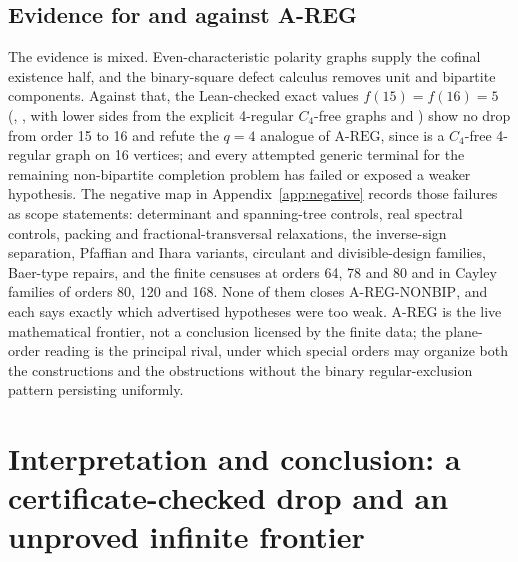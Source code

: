 \documentclass{anvil-paper}
\newcommand{\AREG}{\mathrm{A\text{-}REG}}
\newcommand{\NONBIP}{\mathrm{A\text{-}REG\text{-}NONBIP}}
\theoremstyle{definition}
\begin{document}
\subsection{Evidence for and against A-REG}\label{sec:areg-evidence}

The evidence is mixed. Even-characteristic polarity graphs supply the cofinal existence half, and the binary-square defect calculus removes unit and bipartite components. Against that, the Lean-checked exact values $f(15)=f(16)=5$ (, , with lower sides from the explicit 4-regular $C_4$-free graphs  and ) show no drop from order 15 to 16 and refute the $q=4$ analogue of $\AREG$, since  is a $C_4$-free 4-regular graph on 16 vertices; and every attempted generic terminal for the remaining non-bipartite completion problem has failed or exposed a weaker hypothesis. The negative map in Appendix~\ref{app:negative} records those failures as scope statements: determinant and spanning-tree controls, real spectral controls, packing and fractional-transversal relaxations, the inverse-sign separation, Pfaffian and Ihara variants, circulant and divisible-design families, Baer-type repairs, and the finite censuses at orders 64, 78 and 80 and in Cayley families of orders 80, 120 and 168. None of them closes $\NONBIP$, and each says exactly which advertised hypotheses were too weak. $\AREG$ is the live mathematical frontier, not a conclusion licensed by the finite data; the plane-order reading is the principal rival, under which special orders may organize both the constructions and the obstructions without the binary regular-exclusion pattern persisting uniformly.

\section{Interpretation and conclusion: a certificate-checked drop and an unproved infinite frontier}\label{sec:interpretation}
\end{document}

